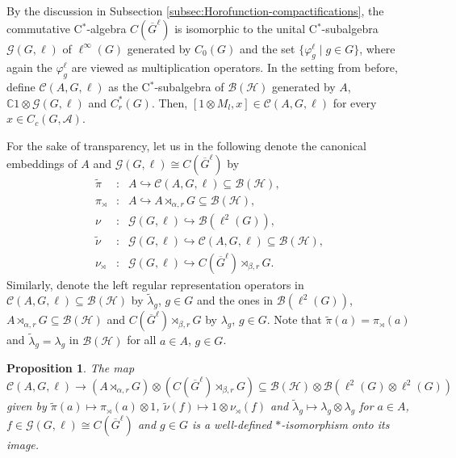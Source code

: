 \documentclass[a4paper,11pt,reqno]{amsart}
\numberwithin{equation}{section}
\numberwithin{equation}{section}
\newtheorem{proposition}[theorem]{Proposition}
\theoremstyle{definition}
\theoremstyle{remark}
\theoremstyle{remark}
\begin{document}
By the discussion in Subsection \ref{subsec:Horofunction-compactifications},
the commutative C$^{\ast}$-algebra $C(\overline{G}^{\ell})$ is isomorphic
to the unital C$^{\ast}$-subalgebra $\mathcal{G}(G,\ell)$ of $\ell^{\infty}(G)$
generated by $C_{0}(G)$ and the set $\{\varphi_{g}^{\ell}\mid g\in G\}$,
where again the $\varphi_{g}^{\ell}$ are viewed as multiplication
operators. In the setting from before, define $\mathcal{C}(A,G,\ell)$
as the C$^{\ast}$-subalgebra of $\mathcal{B}(\mathcal{H})$ generated
by $A$, $\mathbb{C}1\otimes\mathcal{G}(G,\ell)$ and $C_{r}^{\ast}(G)$.
Then, $[1\otimes M_{l},x]\in\mathcal{C}(A,G,\ell)$ for every $x\in C_{c}(G,\mathcal{A})$.

For the sake of transparency, let us in the following denote the canonical
embeddings of $A$ and $\mathcal{G}(G,\ell)\cong C(\overline{G}^{\ell})$
by 
\begin{eqnarray}
\nonumber
\widetilde{\pi} &:& A\hookrightarrow\mathcal{C}(A,G,\ell)\subseteq\mathcal{B}(\mathcal{H}),\\
\nonumber
\pi_{\rtimes} &:& A\hookrightarrow A\rtimes_{\alpha,r}G\subseteq\mathcal{B}(\mathcal{H}),\\
\nonumber
\nu &:& \mathcal{G}(G,\ell)\hookrightarrow\mathcal{B}(\ell^{2}(G)),\\
\nonumber
\widetilde{\nu} &:& \mathcal{G}(G,\ell)\hookrightarrow\mathcal{C}(A,G,\ell)\subseteq\mathcal{B}(\mathcal{H}), \\
\nonumber
\nu_{\rtimes} &:& \mathcal{G}(G,\ell)\hookrightarrow C(\overline{G}^{\ell})\rtimes_{\beta,r}G.
\end{eqnarray}
Similarly, denote the left regular representation operators in $\mathcal{C}(A,G,\ell)\subseteq\mathcal{B}(\mathcal{H})$
by $\widetilde{\lambda}_{g}$, $g\in G$ and the ones in $\mathcal{B}(\ell^{2}(G))$,
$A\rtimes_{\alpha,r}G\subseteq\mathcal{B}(\mathcal{H})$ and $C(\overline{G}^{\ell})\rtimes_{\beta,r}G$
by $\lambda_{g}$, $g\in G$. Note that $\widetilde{\pi}(a)=\pi_{\rtimes}(a)$
and $\widetilde{\lambda}_{g}=\lambda_{g}$ in $\mathcal{B}(\mathcal{H})$
for all $a\in A$, $g\in G$.

\begin{proposition} \label{Isomorphism-1} The map $\mathcal{C}(A,G,\ell)\rightarrow(A\rtimes_{\alpha,r}G)\otimes(C(\overline{G}^{\ell})\rtimes_{\beta,r}G)\subseteq\mathcal{B}(\mathcal{H})\otimes\mathcal{B}(\ell^{2}(G)\otimes\ell^{2}(G))$
given by $\widetilde{\pi}(a)\mapsto\pi_{\rtimes}(a)\otimes1$, $\widetilde{\nu}(f)\mapsto1\otimes\nu_{\rtimes}(f)$
and $\widetilde{\lambda}_{g}\mapsto\lambda_{g}\otimes\lambda_{g}$
for $a\in A$, $f\in\mathcal{G}(G,\ell)\cong C(\overline{G}^{\ell})$
and $g\in G$ is a well-defined $\ast$-isomorphism onto its image.
\end{proposition}
\end{document}
